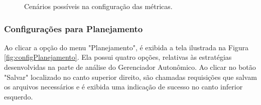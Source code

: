 \documentclass[portugues]{ic-tese}
\begin{document}
\begin{figure}[H]
    \centering
    \caption{Cenários possíveis na configuração das métricas.}
    \label{fig:cenariosMetricas}
\end{figure}

\subsubsection{Configurações para Planejamento}

Ao clicar a opção do menu "Planejamento", é exibida a tela ilustrada na Figura \ref{fig:configPlanejamento}. Ela possui quatro opções, relativas às estratégias desenvolvidas na parte de análise do Gerenciador Autonômico. Ao clicar no botão "Salvar" localizado no canto superior direito, são chamadas requisições que salvam os arquivos necessários e é exibida uma indicação de sucesso no canto inferior esquerdo.
\end{document}
